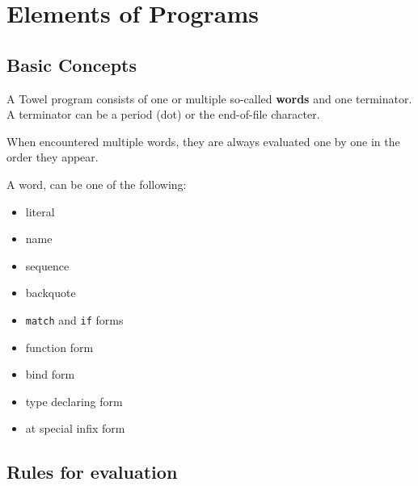 \documentclass{book}
\begin{document}
\chapter{Elements of Programs}
\label{chap:forms}

\section{Basic Concepts}

A Towel program consists of one or multiple so-called \textbf{words} and one terminator. A terminator can be a period (dot) or the end-of-file character.

When encountered multiple words, they are always evaluated one by one in the order they appear.

A word, can be one of the following:
\begin{itemize}
\item literal
\item name
\item sequence
\item backquote
\item \texttt{match} and \texttt{if} forms
\item function form
\item bind form
\item type declaring form
\item at special infix form
\end{itemize}

\section{Rules for evaluation}
\end{document}
